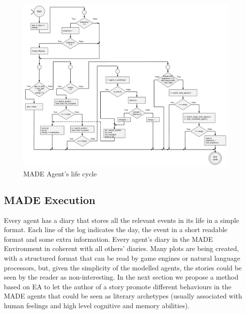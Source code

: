 \documentclass[runningheads]{llncs}
\begin{document}
\begin{figure}
\begin{center}
\includegraphics[scale=0.32]{img/life_cycle.pdf}
\caption{MADE Agent's life cycle}
\label{fig:lifecycle}
\end{center}
\end{figure}



\subsection{MADE Execution}

Every agent has a diary that stores all the relevant events in its life in a simple format. Each line of the log indicates the day, the event in a short readable format and some extra information. Every agent's diary in the MADE Environment in coherent with all others' diaries. Many plots are being created, with a structured format that can be read by game engines or natural language processors, but, given the simplicity of the modelled agents, the stories could be seen by the reader as non-interesting. In the next section we propose a method based on EA to let the author of a story promote different behaviours in the MADE agents that could be seen as literary archetypes (usually associated with human feelings and high level cognitive and memory abilities).
\end{document}
